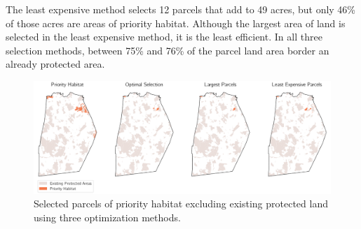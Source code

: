 \documentclass[12pt, stu, floatsintext,table]{apa7}
\begin{document}
The least expensive method selects 12 parcels that add to 49 acres, but only 46\% of those acres are areas of priority habitat. Although the largest area of land is selected in the least expensive method, it is the least efficient. In all three selection methods, between 75\% and 76\% of the parcel land area border an already protected area. 
\begin{figure}[hbtp]
    \centering
    \includegraphics[width = \textwidth]{figures/n_61prihab.png}
    \caption{Selected parcels of priority habitat excluding existing protected land using three optimization methods. }
\end{figure}
\begin{table}[hbtp]
\caption{Summary of priority habitat parcel selections using three methods.}
\end{table}
\end{document}
